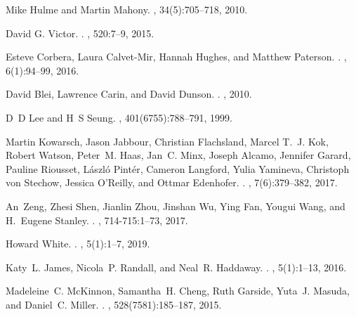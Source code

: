 \documentclass{article}
\begin{document}
\begin{thebibliography}{10}
		Mike Hulme and Martin Mahony.
		, 34(5):705--718, 2010.
		
		{David G. Victor}.
		.
		, 520:7--9, 2015.
		
		Esteve Corbera, Laura Calvet-Mir, Hannah Hughes, and Matthew Paterson.
		.
		, 6(1):94--99, 2016.
		
		David Blei, Lawrence Carin, and David Dunson.
		.
		, 2010.
		
		D~D Lee and H~S Seung.
		, 401(6755):788--791, 1999.
		
		Martin Kowarsch, Jason Jabbour, Christian Flachsland, Marcel T.~J. Kok, Robert
		Watson, Peter~M. Haas, Jan~C. Minx, Joseph Alcamo, Jennifer Garard, Pauline
		Riousset, L{\'{a}}szl{\'{o}} Pint{\'{e}}r, Cameron Langford, Yulia Yamineva,
		Christoph von Stechow, Jessica O'Reilly, and Ottmar Edenhofer.
		.
		, 7(6):379--382, 2017.
		
		An~Zeng, Zhesi Shen, Jianlin Zhou, Jinshan Wu, Ying Fan, Yougui Wang, and
		H.~Eugene Stanley.
		.
		, 714-715:1--73, 2017.
		
		Howard White.
		.
		, 5(1):1--7, 2019.
		
		Katy~L. James, Nicola~P. Randall, and Neal~R. Haddaway.
		.
		, 5(1):1--13, 2016.
		
		Madeleine~C. McKinnon, Samantha~H. Cheng, Ruth Garside, Yuta~J. Masuda, and
		Daniel~C. Miller.
		.
		, 528(7581):185--187, 2015.
		

\end{thebibliography}
\end{document}
